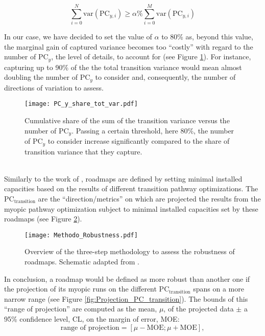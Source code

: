 \begin{equation}
\label{eq:PC_transition}
\sum_{i=0}^N\text{var}\left(\text{PC}_{y,i}\right)\geq \alpha\% \sum_{i=0}^M\text{var}\left(\text{PC}_{y,i}\right)
\end{equation}

In our case, we have decided to set the value of $\alpha$ to 80\% as, beyond this value, the marginal gain of captured variance becomes too ``costly'' with regard to the number of $\text{PC}_{y}$, \ie the level of details, to account for (see Figure \ref{fig:PC_y_share_tot_var}). For instance, capturing up to 90\% of the the total transition variance would mean almost doubling the number of $\text{PC}_{y}$ to consider and, consequently, the number of directions of variation to assess.

\begin{figure}[!htbp]
\centering
\texttt{[image: PC\_y\_share\_tot\_var.pdf]}
\caption{Cumulative share of the sum of the transition variance versus the number of $\text{PC}_{y}$. Passing a certain threshold, here 80\%, the number of $\text{PC}_{y}$ to consider increase significantly compared to the share of transition variance that they capture.}
\label{fig:PC_y_share_tot_var}
\end{figure}

\\

\noindent
Similarly to the work of \citet{moret2020overcapacity}, roadmaps are defined by setting minimal installed capacities based on the results of different transition pathway optimizations. The $\text{PC}_{\text{transition}}$ are the ``direction/metrics'' on which are projected the results from the myopic pathway optimization subject to minimal installed capacities set by these roadmaps (see Figure \ref{fig:Methodo_Robustness}).  

\begin{figure}[!htbp]
\centering
\texttt{[image: Methodo\_Robustness.pdf]}
\caption{Overview of the three-step methodology to assess the robustness of roadmaps. Schematic adapted from \cite{moret2020overcapacity}.}
\label{fig:Methodo_Robustness}
\end{figure}

In conclusion, a roadmap would be defined as more robust than another one if the projection of its myopic runs on the different $\text{PC}_{\text{transition}}$ spans on a more narrow range (see Figure \ref{fig:Projection_PC_transition}). The bounds of this ``range of projection'' are computed as the mean, $\mu$, of the projected data $\pm$ a 95\% confidence level, CL, on the margin of error, MOE:
$$
\text{range of projection} = [\mu-\mathrm{MOE}; \mu + \mathrm{MOE}],
$$

